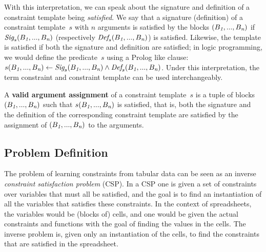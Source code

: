 
With this interpretation, we can speak about the signature and definition of a constraint template being \textit{satisfied}.
We say that a signature (definition) of a constraint template~$s$ with $n$ arguments is satisfied by the blocks $(B_{\textit{1}}, ..., B_{\textit{n}})$ if $\textit{Sig}_s(B_{\textit{1}}, ..., B_{\textit{n}})$ (respectively $\textit{Def}_s(B_{\textit{1}}, ..., B_{\textit{n}})$) is satisfied.
Likewise, the template is satisfied if both the signature and definition are satisfied; in logic programming, we would define the predicate~$s$ using a Prolog like clause: $s(B_{\textit{1}}, ..., B_{\textit{n}}) \leftarrow \textit{Sig}_s(B_{\textit{1}}, ..., B_{\textit{n}}) \wedge \textit{Def}_s(B_{\textit{1}}, ..., B_{\textit{n}})$.
Under this interpretation, the term constraint and constraint template can be used interchangeably.

\begin{definition}
A \textbf{valid argument assignment} of a constraint template~$s$ is a tuple of blocks $(B_{\textit{1}}, ..., B_{\textit{n}})$ such that $s(B_{\textit{1}}, ..., B_{\textit{n}})$ is satisfied, that is, both the signature and the definition of the corresponding constraint template are satisfied by the assignment of $(B_{\textit{1}}, ..., B_{\textit{n}})$ to the arguments.
\end{definition}





\subsection{Problem Definition}\label{sec:problem_statement}
The problem of learning constraints from tabular data can be seen as an inverse {\em constraint satisfaction problem} (CSP).
In a CSP one is given a set of constraints over variables that must all be satisfied, and the goal is to find an instantiation of all the variables that satisfies these constraints.
In the context of spreadsheets, the variables would be (blocks of) cells, and one would be given the actual constraints and functions with the goal of finding the values in the cells.
The inverse problem is, given only an instantiation of the cells, to find the constraints that are satisfied in the spreadsheet.

